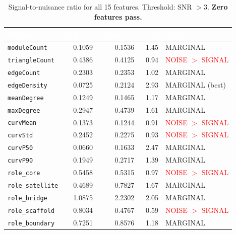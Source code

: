 \documentclass{../yalumba}
\begin{document}
\begin{table}[H]
\centering
\caption{Signal-to-nuisance ratio for all 15 features. Threshold: SNR $> 3$.
\textbf{Zero features pass.}}
\label{tab:snr}
\begin{tabular}{lrrrp{5.5cm}}
\toprule
\rowcolor{table-header}
\textcolor{white}{\textbf{Feature}} & \textcolor{white}{\textbf{Self CV}} & \textcolor{white}{\textbf{Cross CV}} & \textcolor{white}{\textbf{SNR}} & \textcolor{white}{\textbf{Verdict}} \\
\midrule
\texttt{moduleCount}      & 0.1059 & 0.1536 & 1.45 & \textcolor{yalumba-gold}{MARGINAL} \\
\texttt{triangleCount}    & 0.4386 & 0.4125 & 0.94 & \textcolor{red}{NOISE $>$ SIGNAL} \\
\texttt{edgeCount}        & 0.2303 & 0.2353 & 1.02 & \textcolor{yalumba-gold}{MARGINAL} \\
\texttt{edgeDensity}      & 0.0725 & 0.2124 & 2.93 & \textcolor{yalumba-gold}{MARGINAL (best)} \\
\texttt{meanDegree}       & 0.1249 & 0.1465 & 1.17 & \textcolor{yalumba-gold}{MARGINAL} \\
\texttt{maxDegree}        & 0.2947 & 0.4739 & 1.61 & \textcolor{yalumba-gold}{MARGINAL} \\
\texttt{curvMean}         & 0.1373 & 0.1244 & 0.91 & \textcolor{red}{NOISE $>$ SIGNAL} \\
\texttt{curvStd}          & 0.2452 & 0.2275 & 0.93 & \textcolor{red}{NOISE $>$ SIGNAL} \\
\texttt{curvP50}          & 0.0660 & 0.1633 & 2.47 & \textcolor{yalumba-gold}{MARGINAL} \\
\texttt{curvP90}          & 0.1949 & 0.2717 & 1.39 & \textcolor{yalumba-gold}{MARGINAL} \\
\texttt{role\_core}       & 0.5458 & 0.5315 & 0.97 & \textcolor{red}{NOISE $>$ SIGNAL} \\
\texttt{role\_satellite}  & 0.4689 & 0.7827 & 1.67 & \textcolor{yalumba-gold}{MARGINAL} \\
\texttt{role\_bridge}     & 1.0875 & 2.2302 & 2.05 & \textcolor{yalumba-gold}{MARGINAL} \\
\texttt{role\_scaffold}   & 0.8034 & 0.4767 & 0.59 & \textcolor{red}{NOISE $>$ SIGNAL} \\
\texttt{role\_boundary}   & 0.7251 & 0.8576 & 1.18 & \textcolor{yalumba-gold}{MARGINAL} \\
\bottomrule
\end{tabular}
\end{table}
\end{document}
